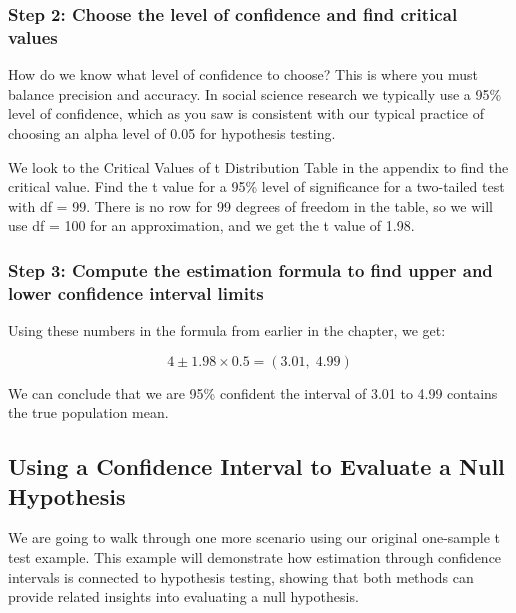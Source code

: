 \documentclass[
  letterpaper,
  DIV=11,
  numbers=noendperiod]{scrreprt}
\begin{document}
\subsubsection*{Step 2: Choose the level of confidence and find critical
values}\label{step-2-choose-the-level-of-confidence-and-find-critical-values-1}

How do we know what level of confidence to choose? This is where you
must balance precision and accuracy. In social science research we
typically use a 95\% level of confidence, which as you saw is consistent
with our typical practice of choosing an alpha level of 0.05 for
hypothesis testing.

We look to the Critical Values of t Distribution Table in the appendix
to find the critical value. Find the t value for a 95\% level of
significance for a two-tailed test with df = 99. There is no row for 99
degrees of freedom in the table, so we will use df = 100 for an
approximation, and we get the t value of 1.98.

\subsubsection*{Step 3: Compute the estimation formula to find upper and
lower confidence interval
limits}\label{step-3-compute-the-estimation-formula-to-find-upper-and-lower-confidence-interval-limits}

Using these numbers in the formula from earlier in the chapter, we get:

\[
4 \pm 1.98 \times 0.5 = (3.01,\; 4.99)
\]

We can conclude that we are 95\% confident the interval of 3.01 to 4.99
contains the true population mean.

\subsection{Using a Confidence Interval to Evaluate a Null
Hypothesis}\label{using-a-confidence-interval-to-evaluate-a-null-hypothesis-1}

We are going to walk through one more scenario using our original
one-sample t test example. This example will demonstrate how estimation
through confidence intervals is connected to hypothesis testing, showing
that both methods can provide related insights into evaluating a null
hypothesis.
\end{document}
